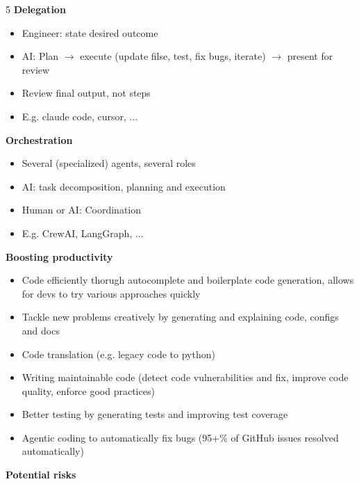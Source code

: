 \documentclass[landscape,a4paper]{extarticle}
\begin{document}
\begin{multicols*}{5}
    \textbf{Delegation}
    \begin{itemize}
        \item Engineer: state desired outcome
        \item AI: Plan $\rightarrow$ execute (update filse, test, fix bugs, iterate)
        $\rightarrow$ present for review
        \item Review final output, not steps
        \item E.g. claude code, cursor, ...
    \end{itemize}

    \textbf{Orchestration}
    \begin{itemize}
        \item Several (specialized) agents, several roles
        \item AI: task decomposition, planning and execution
        \item Human or AI: Coordination
        \item E.g. CrewAI, LangGraph, ...
    \end{itemize}

    \textbf{Boosting productivity}
    \begin{itemize}
        \item Code efficiently thorugh autocomplete and boilerplate code generation, 
        allows for devs to try various approaches quickly
        \item Tackle new problems creatively by generating and explaining code, configs and docs
        \item Code translation (e.g. legacy code to python)
        \item Writing maintainable code (detect code vulnerabilities and fix, improve code quality, enforce good practices)
        \item Better testing by generating tests and improving test coverage
        \item Agentic coding to automatically fix bugs (95+\% of GitHub issues resolved automatically)
    \end{itemize}

    \textbf{Potential risks}


\end{multicols*}
\end{document}
